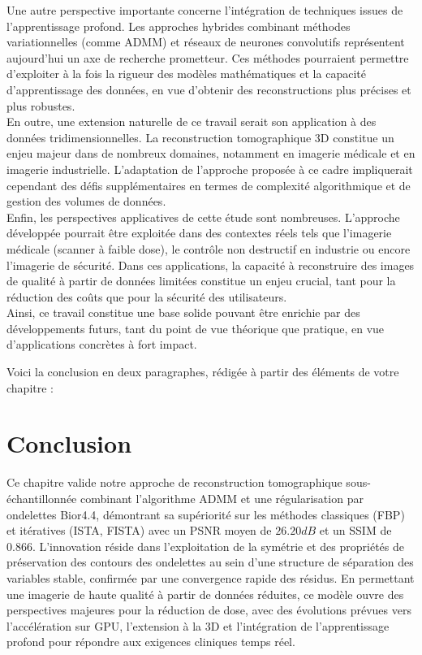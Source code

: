 Une autre perspective importante concerne l'intégration de techniques issues de l'apprentissage profond. Les approches hybrides combinant méthodes variationnelles (comme ADMM) et réseaux de neurones convolutifs représentent aujourd'hui un axe de recherche prometteur. Ces méthodes pourraient permettre d'exploiter à la fois la rigueur des modèles mathématiques et la capacité d'apprentissage des données, en vue d'obtenir des reconstructions plus précises et plus robustes.\\

En outre, une extension naturelle de ce travail serait son application à des données tridimensionnelles. La reconstruction tomographique 3D constitue un enjeu majeur dans de nombreux domaines, notamment en imagerie médicale et en imagerie industrielle. L'adaptation de l'approche proposée à ce cadre impliquerait cependant des défis supplémentaires en termes de complexité algorithmique et de gestion des volumes de données.\\

Enfin, les perspectives applicatives de cette étude sont nombreuses. L'approche développée pourrait être exploitée dans des contextes réels tels que l'imagerie médicale (scanner à faible dose), le contrôle non destructif en industrie ou encore l'imagerie de sécurité. Dans ces applications, la capacité à reconstruire des images de qualité à partir de données limitées constitue un enjeu crucial, tant pour la réduction des coûts que pour la sécurité des utilisateurs.\\

Ainsi, ce travail constitue une base solide pouvant être enrichie par des développements futurs, tant du point de vue théorique que pratique, en vue d'applications concrètes à fort impact.


Voici la conclusion en deux paragraphes, rédigée à partir des éléments de votre chapitre :

\section*{Conclusion}
Ce chapitre valide notre approche de reconstruction tomographique sous-échantillonnée combinant l'algorithme ADMM et une régularisation par ondelettes Bior4.4, démontrant sa supériorité sur les méthodes classiques (FBP) et itératives (ISTA, FISTA) avec un PSNR moyen de $26.20 dB$ et un SSIM de $0.866$. L'innovation réside dans l'exploitation de la symétrie et des propriétés de préservation des contours des ondelettes au sein d'une structure de séparation des variables stable, confirmée par une convergence rapide des résidus. En permettant une imagerie de haute qualité à partir de données réduites, ce modèle ouvre des perspectives majeures pour la réduction de dose, avec des évolutions prévues vers l'accélération sur GPU, l'extension à la 3D et l'intégration de l'apprentissage profond pour répondre aux exigences cliniques temps réel.